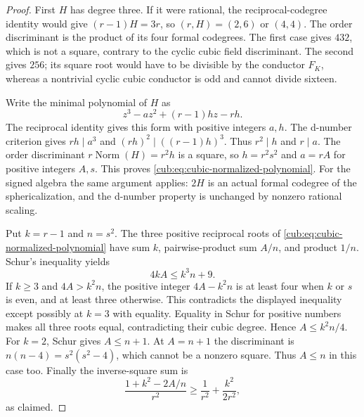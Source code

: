 \documentclass[11pt,a4paper]{article}
\theoremstyle{definition}\newtheorem{definition}[theorem]{Definition}
\theoremstyle{remark}\newtheorem{remark}[theorem]{Remark}
\numberwithin{equation}{section}
\begin{document}
\begin{proof}
First $H$ has degree three. If it were rational, the reciprocal-codegree
identity would give $(r-1)H=3r$, so $(r,H)=(2,6)$ or $(4,4)$.
The order discriminant is the product of its four formal codegrees.
The first case gives $432$, which is not a square, contrary to the
cyclic cubic field discriminant. The second gives $256$; its square
root would have to be divisible by the conductor $F_K$, whereas a
nontrivial cyclic cubic conductor is odd and cannot divide sixteen.

Write the minimal polynomial of $H$ as
\[
 z^3-a z^2+(r-1)h z-rh.
\]
The reciprocal identity gives this form with positive integers $a,h$.
The d-number criterion gives $rh\mid a^3$ and
$(rh)^2\mid((r-1)h)^3$. Thus $r^2\mid h$ and $r\mid a$.
The order discriminant $r\operatorname{Norm}(H)=r^2h$ is a square,
so $h=r^2s^2$ and $a=rA$ for positive integers $A,s$. This proves
\eqref{cub:eq:cubic-normalized-polynomial}. For the signed algebra the
same argument applies: $2H$ is an actual formal codegree of the
sphericalization, and the d-number property is unchanged by nonzero
rational scaling.

Put $k=r-1$ and $n=s^2$. The three positive reciprocal roots of
\eqref{cub:eq:cubic-normalized-polynomial} have sum $k$, pairwise-product
sum $A/n$, and product $1/n$. Schur's inequality yields
\[
 4kA\le k^3n+9.
\]
If $k\ge3$ and $4A>k^2n$, the positive integer $4A-k^2n$ is at least
four when $k$ or $s$ is even, and at least three otherwise. This
contradicts the displayed inequality except possibly at $k=3$ with
equality. Equality in Schur for positive numbers makes all three roots
equal, contradicting their cubic degree. Hence $A\le k^2n/4$.
For $k=2$, Schur gives $A\le n+1$. At $A=n+1$ the discriminant is
$n(n-4)=s^2(s^2-4)$, which cannot be a nonzero square. Thus $A\le n$
in this case too. Finally the inverse-square sum is
\[
 \frac{1+k^2-2A/n}{r^2}
 \ge\frac1{r^2}+\frac{k^2}{2r^2},
\]
as claimed.
\end{proof}
\end{document}

